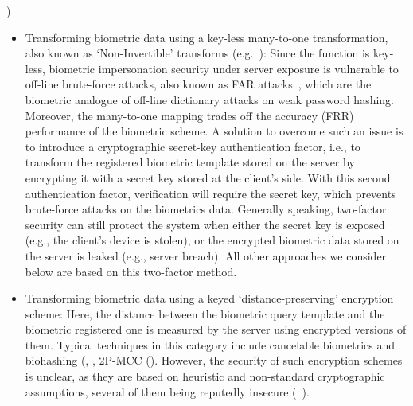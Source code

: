 \cite{jain2008biometric}) \begin{itemize} \item Transforming biometric data
  using a key-less many-to-one transformation, also known as `Non-Invertible'
  transforms (e.g.~\cite{ratha2007generating}): Since the function is key-less,
  biometric impersonation security under server exposure is vulnerable to
  off-line brute-force attacks, also known as FAR
  attacks~\cite{uludag2004attacks,roberts2007biometric}, which are the biometric
  analogue of off-line dictionary attacks on weak password hashing. Moreover,
  the many-to-one mapping trades off the accuracy (FRR) performance of
  the biometric scheme. A solution to overcome such an issue is to introduce a
  cryptographic secret-key authentication factor, i.e., to transform the
  registered biometric template stored on the server by encrypting it with a
  secret key stored at the client's side. With this second authentication
  factor, verification will require the secret key, which prevents brute-force
  attacks on the biometrics data. Generally speaking, two-factor security can still protect the system when either the secret key is exposed (e.g., the client's device is
  stolen), or the encrypted biometric data stored on the server is leaked (e.g.,
  server breach). All other approaches we consider below are based on this
  two-factor method.


\item Transforming biometric data using a keyed `distance-preserving' encryption scheme:  Here, the distance between the biometric query template and the biometric registered one is measured by the server using encrypted versions of them.  Typical techniques in this category include
            cancelable biometrics and biohashing (\cite{teoh2008cancellable}, \cite{jin2004biohashing}, 2P-MCC (\cite{cappelli2010minutia}). %
However, the security of such encryption schemes is unclear, as they are based on heuristic and non-standard cryptographic assumptions, several of them being reputedly insecure (~\cite{lee2009inverse,lacharme2013preimage}).


\end{itemize}
